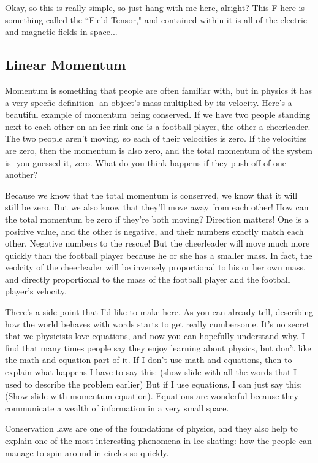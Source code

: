 \documentclass[12pt]{article}
\begin{document}
Okay, so this is really simple, so just hang with me here, alright? 
This F here is something called the ``Field Tensor," and 
contained within it is all of the electric and magnetic fields in space... 
\subsection{Linear Momentum}
Momentum is something
that people are often familiar with, but in physics it has a very specfic definition-
an object's mass multiplied by its velocity.
Here's a beautiful example of momentum being conserved. If we have two people standing next to each other on 
an ice rink one is a football player, the other a cheerleader. The two people aren't moving,
so each of their velocities is zero. If the velocities are zero, then the momentum is 
also zero, and the total momentum of the system is- you guessed it, zero. 
What do you think happens if they push off of one another? 

Because we know that the total momentum is conserved, we know that it will still be zero.
But we also know that they'll move away from each other! How can the total momentum be
zero if they're both moving? Direction matters! One is a positive value, and the other
is negative, and their numbers exactly match each other. Negative numbers to the 
rescue!
But the cheerleader will move much more quickly
than the football player because he or she has a smaller mass. In fact, the veolcity 
of the cheerleader will be inversely proportional to his or her own mass, and directly 
proportional to the mass of the football player and the football player's velocity. 

There's a side point that I'd like to make here.
As you can already tell, describing how the world behaves with words starts to get 
really cumbersome. It's no secret that we physicists love equations, and now you
can hopefully understand why. I find that many times people say they enjoy learning
about physics, but don't like the math and equation part of it. If I don't use
math and equations, then to explain what happens I have to say this:
(show slide with all the words that I used to 
describe the problem earlier)
But if I use equations, I can just say this:
(Show slide with momentum equation). 
Equations are wonderful because they communicate a wealth of information in a very 
small space. 

Conservation laws are one of the foundations of physics, and they also help to explain
one of the most interesting phenomena in Ice skating: how the people can manage to 
spin around in circles so quickly. 
\end{document}
